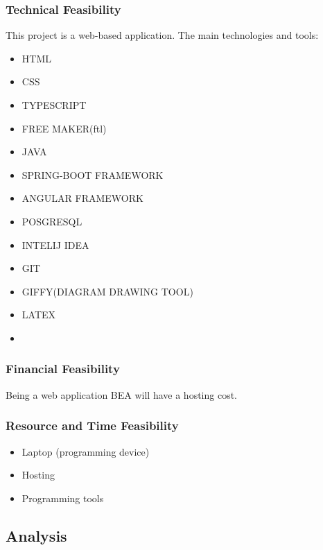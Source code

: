 \documentclass{scrartcl}
\begin{document}
\subsubsection{Technical Feasibility}
This project is a web-based application. The main technologies and tools:
\begin{itemize}
  	\item HTML
  	\item CSS
  	\item TYPESCRIPT
  	\item FREE MAKER(ftl)
  	\item JAVA
  	\item SPRING-BOOT FRAMEWORK
  	\item ANGULAR FRAMEWORK
  	\item POSGRESQL
  	\item INTELIJ IDEA
  	\item GIT
  	\item GIFFY(DIAGRAM DRAWING TOOL)
  	\item LATEX
  	\item
  	
  	\end{itemize}
 \subsubsection{Financial Feasibility}
 Being a web application BEA will have a hosting cost.
 \subsubsection{Resource and Time Feasibility}
 \begin{itemize}
 \item Laptop (programming device)
 \item Hosting
 \item Programming tools
 \end{itemize}
 


\subsection{Analysis} 	 
\end{document}
